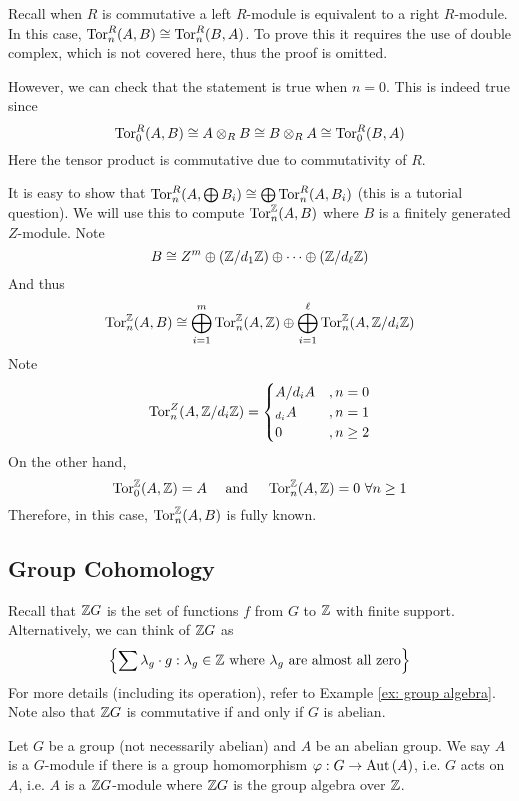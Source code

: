 \begin{re}
    Recall when $R$ is commutative a left $R$-module is equivalent to a right $R$-module. In this case, $\operatorname{Tor}_n^R(A,B)\cong \operatorname{Tor}_n^R(B,A)$. To prove this it requires the use of double complex, which is not covered here, thus the proof is omitted.

    However, we can check that the statement is true when $n=0$. This is indeed true since 
    \[\operatorname{Tor}_0^R(A,B)\cong A\otimes_R B \cong B\otimes_R A \cong \operatorname{Tor}_0^R(B,A)\]
    Here the tensor product is commutative due to commutativity of $R$.
\end{re}

\medskip

\begin{ex}
    It is easy to show that $\operatorname{Tor}_n^R(A,\bigoplus B_i) \cong \bigoplus \operatorname{Tor}_n^R(A,B_i)$ (this is a tutorial question). We will use this to compute $\operatorname{Tor}_n^{\mathbb Z}(A,B)$ where $B$ is a finitely generated $Z$-module. Note
    \[B\cong Z^m \oplus ({\mathbb Z}/d_1{\mathbb Z}) \oplus \dots \oplus({\mathbb Z}/d_\ell {\mathbb Z})\]
    And thus
    \[\operatorname{Tor}_n^{\mathbb Z}(A,B)\cong \bigoplus_{i=1}^m \operatorname{Tor}^{\mathbb Z}_n(A,{\mathbb Z}) \oplus \bigoplus_{i=1}^\ell \operatorname{Tor}_n^{\mathbb Z}(A,{\mathbb Z}/d_i{\mathbb Z})\]
    Note 
    \[\operatorname{Tor}_n^Z(A,{\mathbb Z}/d_i{\mathbb Z})=
    \begin{cases}
        A/d_iA&, n=0\\
        _{d_i}A&, n=1\\
        0&, n\geq 2
    \end{cases}\]
    On the other hand,
    \[\operatorname{Tor}_0^{\mathbb Z}(A,{\mathbb Z})=A\quad \text{ and } \quad \operatorname{Tor}_n^{\mathbb Z}(A,{\mathbb Z})=0\ \forall n\geq 1\]
    Therefore, in this case, $\operatorname{Tor}_n^{\mathbb Z}(A,B)$ is fully known.
\end{ex}

\newpage
\subsection{Group Cohomology}
Recall that ${\mathbb Z} G$ is the set of functions $f$ from $G$ to ${\mathbb Z}$ with finite support. Alternatively, we can think of ${\mathbb Z} G$ as 
\[\left\{\sum \lambda_g \cdot g:\lambda_g \in {\mathbb Z}\text{ where $\lambda_g$ are almost all zero}\right\}\]
For more details (including its operation), refer to Example \ref{ex: group algebra}. Note also that ${\mathbb Z} G$ is commutative if and only if $G$ is abelian.

\medskip

\begin{defn} [$G$-module]
    Let $G$ be a group (not necessarily abelian) and $A$ be an abelian group. We say $A$ is a $G$-module if there is a group homomorphism $\varphi:G\to \operatorname{Aut}\left(A\right)$, i.e. $G$ acts on $A$, i.e. $A$ is a ${\mathbb Z} G$-module where ${\mathbb Z} G$ is the group algebra over ${\mathbb Z}$.
\end{defn}

